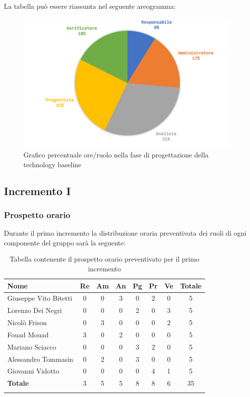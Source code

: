 		La tabella può essere riassunta nel seguente areogramma:
		\begin{figure}[H]
			\centering
			\includegraphics[width=0.8\linewidth]{./images/preventivo/progArch2.png}
			\caption{Grafico percentuale ore/ruolo nella fase di progettazione della technology baseline}
			\label{fig:grafico costi ruolo fase progettazione della technology baseline}
		\end{figure}
	
	
	\subsection{Incremento I}
		\subsubsection{Prospetto orario}
		Durante il primo incremento la distribuzione oraria preventivata dei ruoli di ogni componente del gruppo sarà la seguente:
		
		\begin{longtable}{|l|c|c|c|c|c|c|c|}
			\hline
			\rowcolor{lighter-grayer}
			\textbf{Nome} & \textbf{Re} & \textbf{Am} & \textbf{An} & \textbf{Pg}  & \textbf{Pr}   & \textbf{Ve} & \textbf{Totale} \\
			\hline
			\endfirsthead
			
			\hline
			Giuseppe Vito Bitetti 		 & 0 & 0 & 3 & 0 & 2 & 0 & 5\\
			\hline
			\hline
			Lorenzo Dei Negri			 & 0 & 0 & 0 & 2 & 0 & 3 & 5\\
			\hline
			\hline
			Nicolò Frison				    & 0 & 3 & 0 & 0 & 0 & 2 & 5\\
			\hline
			\hline
			Fouad Mouad 				 & 3 & 0 & 2 & 0 & 0 & 0 & 5\\
			\hline
			\hline
			Mariano Sciacco 			 & 0 & 0 & 0 & 3 & 2 & 0 & 5\\
			\hline
			\hline
			Alessandro Tommasin     & 0 & 2 & 0 & 3 & 0 & 0 & 5\\
			\hline
			\hline
			Giovanni Vidotto 			 & 0 & 0 & 0 & 0 & 4 & 1 & 5\\
			\hline 
			\textbf{Totale}			 		& 3 & 5 & 5 & 8 & 8 & 6 & 35\\
			\hline
			\caption{Tabella contenente il prospetto orario preventivato per il primo incremento}
		\end{longtable}
		\pagebreak
		
